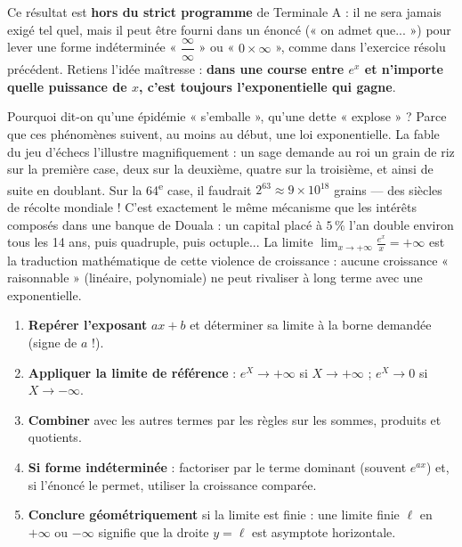 \documentclass[11pt]{article}
\begin{document}
Ce résultat est \textbf{hors du strict programme} de Terminale A : il ne sera jamais exigé tel quel, mais il peut être fourni dans un énoncé (« on admet que... ») pour lever une forme indéterminée « $\dfrac{\infty}{\infty}$ » ou « $0 \times \infty$ », comme dans l'exercice résolu précédent. Retiens l'idée maîtresse : \textbf{dans une course entre $e^x$ et n'importe quelle puissance de $x$, c'est toujours l'exponentielle qui gagne}.

\begin{savaistu}
Pourquoi dit-on qu'une épidémie « s'emballe », qu'une dette « explose » ? Parce que ces phénomènes suivent, au moins au début, une loi exponentielle. La fable du jeu d'échecs l'illustre magnifiquement : un sage demande au roi un grain de riz sur la première case, deux sur la deuxième, quatre sur la troisième, et ainsi de suite en doublant. Sur la 64\textsuperscript{e} case, il faudrait $2^{63} \approx 9 \times 10^{18}$ grains — des siècles de récolte mondiale ! C'est exactement le même mécanisme que les intérêts composés dans une banque de Douala : un capital placé à $5\,\%$ l'an double environ tous les 14 ans, puis quadruple, puis octuple... La limite $\lim_{x \to +\infty} \frac{e^x}{x} = +\infty$ est la traduction mathématique de cette violence de croissance : aucune croissance « raisonnable » (linéaire, polynomiale) ne peut rivaliser à long terme avec une exponentielle.
\end{savaistu}

\begin{methode}
\begin{enumerate}
\item \textbf{Repérer l'exposant} $ax + b$ et déterminer sa limite à la borne demandée (signe de $a$ !).
\item \textbf{Appliquer la limite de référence} : $e^X \to +\infty$ si $X \to +\infty$ ; $e^X \to 0$ si $X \to -\infty$.
\item \textbf{Combiner} avec les autres termes par les règles sur les sommes, produits et quotients.
\item \textbf{Si forme indéterminée} : factoriser par le terme dominant (souvent $e^{ax}$) et, si l'énoncé le permet, utiliser la croissance comparée.
\item \textbf{Conclure géométriquement} si la limite est finie : une limite finie $\ell$ en $+\infty$ ou $-\infty$ signifie que la droite $y = \ell$ est asymptote horizontale.
\end{enumerate}
\end{methode}
\end{document}
